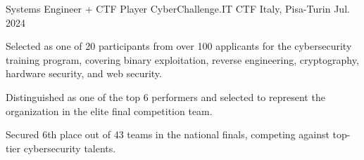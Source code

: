 

\begin{cventries}

  \cventry
    {Systems Engineer + CTF Player} %
    {CyberChallenge.IT CTF} %
    {Italy, Pisa-Turin} %
    {Jul. 2024} %
    {
      \begin{cvitems} %
        \item {Selected as one of 20 participants from over 100 applicants for the cybersecurity training program, covering binary exploitation, reverse engineering, cryptography, hardware security, and web security.}
        \item {Distinguished as one of the top 6 performers and selected to represent the organization in the elite final competition team.}
        \item {Secured 6th place out of 43 teams in the national finals, competing against top-tier cybersecurity talents.}
      \end{cvitems}
    }

\end{cventries}
